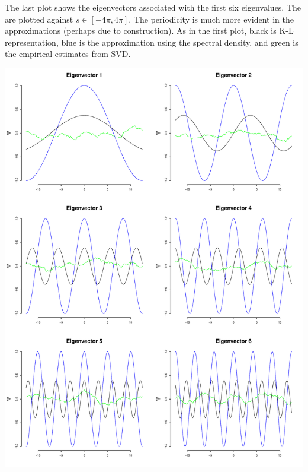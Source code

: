 \documentclass[12pt]{article}
\begin{document}
The last plot shows the eigenvectors associated with the first six eigenvalues. The are plotted against $s\in[-4\pi, 4\pi]$. The periodicity is much more evident in the approximations (perhaps due to construction). As in the first plot, black is K-L representation, blue is the approximation using the spectral density, and green is the empirical estimates from SVD.

\begin{center}
\includegraphics[scale=0.4]{figs/evec.pdf}
\end{center}
\end{document}
